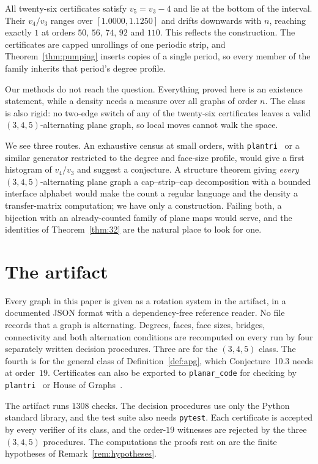 \documentclass[11pt,a4paper]{amsart}
\theoremstyle{plain}
\theoremstyle{definition}
\begin{document}
All twenty-six certificates satisfy $v_5 = v_3 - 4$ and lie at the bottom of
the interval. Their $v_4/v_3$ ranges over $[1.0000, 1.1250]$ and drifts downwards
with $n$, reaching exactly $1$ at orders $50$, $56$, $74$, $92$ and $110$. This
reflects the construction. The certificates are capped unrollings of one
periodic strip, and Theorem~\ref{thm:pumping} inserts copies of a single period,
so every member of the family inherits that period's degree profile.

Our methods do not reach the question. Everything proved here is an existence
statement, while a density needs a measure over all graphs of order $n$. The
class is also rigid: no two-edge switch of any of the twenty-six certificates
leaves a valid $(3,4,5)$-alternating plane graph, so local moves cannot walk the
space.

We see three routes. An exhaustive census at small orders, with
\texttt{plantri}~\cite{plantri} or a similar generator restricted to the degree
and face-size profile, would give a first histogram of $v_4/v_3$ and suggest a
conjecture. A structure theorem giving \emph{every} $(3,4,5)$-alternating plane
graph a cap--strip--cap decomposition with a bounded interface alphabet would
make the count a regular language and the density a transfer-matrix
computation; we have only a construction. Failing both, a
bijection with an already-counted family of plane maps would serve, and the
identities of Theorem~\ref{thm:32} are the natural place to look for one.

\section{The artifact}\label{sec:artifact}

Every graph in this paper is given as a rotation system in the artifact, in a
documented JSON format with a dependency-free reference reader. No file records
that a graph is alternating. Degrees, faces, face sizes, bridges, connectivity
and both alternation conditions are recomputed on every run by four separately
written decision procedures. Three are for the $(3,4,5)$ class. The fourth is
for the general class of Definition~\ref{def:apg}, which Conjecture~10.3 needs
at order~$19$. Certificates can also be exported to \texttt{planar\_code} for
checking by \texttt{plantri}~\cite{plantri} or House of Graphs~\cite{HoG}.

The artifact runs $1308$ checks. The decision procedures use only the Python
standard library, and the test suite also needs \texttt{pytest}. Each
certificate is accepted by every verifier of its class, and the order-$19$
witnesses are rejected by the three $(3,4,5)$ procedures. The computations the
proofs rest on are the finite hypotheses of Remark~\ref{rem:hypotheses}.
\end{document}
